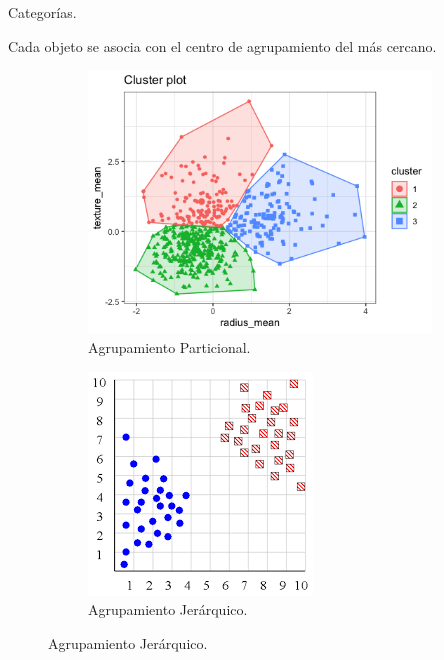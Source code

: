 \begin{frame}[fragile]{Categorías.}{}
\begin{enumerate}
    Cada objeto se asocia con el centro de agrupamiento del más cercano.
  \end{enumerate}
  \begin{figure}
    \centering
    \begin{subfigure}[b]{0.4\textwidth}
      \includegraphics[width=\textwidth]{./Imagenes/kmeans.png}
      \caption*{Agrupamiento Particional.}
    \end{subfigure}
    \begin{subfigure}[b]{0.3\textwidth}
      \includegraphics[width=\textwidth]{./Imagenes/jerarquico.png}
      \caption*{Agrupamiento Jerárquico.}
    \end{subfigure}
  \end{figure}
\end{frame}
